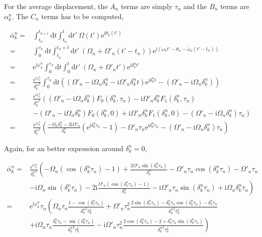 \documentclass[10pt,fleqn]{article}
\newcommand{\ud}{\mathrm{d}}
\newcommand{\ue}{\mathrm{e}}
\newcommand{\ui}{\mathrm{i}}
\newcommand{\eqar}[1]
{
  \begin{align*}
    #1
  \end{align*}
}
\newcommand{\paren}[1]{{\left({#1}\right)}}
\newcommand{\lparen}[1]{{\left({#1}\right.}}
\newcommand{\rparen}[1]{{\left.{#1}\right)}}
\begin{document}
For the average displacement, the $A_n$ terms are simply $\tau_n$ and the $B_n$ terms
are $\alpha_k^n$. The $C_n$ terms has to be computed,
\eqar{
  \bar\alpha_k^n=&\int_{t_{n}}^{t_{n+1}}\!\!\ud t\int_{t_n}^{t}\!\!\ud t'\ \Omega(t')\ue^{\ui\theta_k(t')}\\
  =&\int_{0}^{\tau_n}\!\!\ud t\int_{t_n}^{t_n+t}\!\!\ud t'\ \paren{\Omega_n+\Omega'_n\paren{t'-t_n}}\ue^{\ui\paren{\omega_kt'-\theta_n-\bar\omega_n\paren{t'-t_n}}}\\
  =&\ue^{\ui\varphi_k^n}\int_{0}^{\tau_n}\!\!\ud t\int_{0}^{t}\!\!\ud t'\ \paren{\Omega_n+\Omega'_n t'}\ue^{\ui\delta_k^nt'}\\
  =&\frac{\ue^{\ui\varphi_k^n}}{{\delta_k^n}^2}\int_{0}^{\tau_n}\!\!\ud t
  \paren{\paren{\Omega'_n-\ui\Omega_n\delta_k^n-\ui\Omega'_n\delta_k^nt}\ue^{\ui\delta_k^nt}-\paren{\Omega'_n-\ui\Omega_n\delta_k^n}}\\
  =&\frac{\ue^{\ui\varphi_k^n}}{{\delta_k^n}^2}
  \lparen{\paren{\Omega'_n-\ui\Omega_n\delta_k^n}F_0(\delta_k^n, \tau_n)-\ui\Omega'_n\delta_k^nF_1(\delta_k^n, \tau_n)}\\
  &\rparen{-\paren{\Omega'_n-\ui\Omega_n\delta_k^n}F_0(\delta_k^n, 0)+\ui\Omega'_n\delta_k^nF_1(\delta_k^n, 0)-\paren{\Omega'_n-\ui\Omega_n\delta_k^n}\tau_n}\\
  =&\frac{\ue^{\ui\varphi_k^n}}{{\delta_k^n}^2}
  \paren{\frac{-\Omega_n\delta_k^n-2\ui\Omega'_n}{{\delta_k^n}}\paren{\ue^{\ui{\delta_k^n}\tau_n} - 1}-\Omega'_n\tau_n\ue^{\ui{\delta_k^n}\tau_n}-\paren{\Omega'_n-\ui\Omega_n\delta_k^n}\tau_n}
}

Again, for an better expression around $\delta_k^n=0$,
\eqar{
  \bar\alpha_k^n=&\frac{\ue^{\ui\varphi_k^n}}{{\delta_k^n}^2}
  \lparen{
    -\Omega_n\paren{\cos\paren{{\delta_k^n}\tau_n}-1}
    +\frac{2\Omega'_n\sin\paren{{\delta_k^n}\tau_n}}{{\delta_k^n}}
    -\Omega'_n\tau_n\cos\paren{{\delta_k^n}\tau_n}
    -\Omega'_n\tau_n
  }\\
  &\rparen{
    -\ui\Omega_n\sin\paren{{\delta_k^n}\tau_n}
    -2\ui\frac{\Omega'_n\paren{\cos\paren{{\delta_k^n}\tau_n}-1}}{{\delta_k^n}}
    -\ui\Omega'_n\tau_n\sin\paren{{\delta_k^n}\tau_n}
    +\ui\Omega_n\delta_k^n\tau_n
  }\\
  =&\ue^{\ui\varphi_k^n}\tau_n
  \lparen{
    \Omega_n\tau_n\frac{1-\cos\paren{{\delta_k^n}\tau_n}}{{\delta_k^n}^2\tau_n^2}
    +\Omega'_n\tau_n^2\frac{2\sin\paren{{\delta_k^n}\tau_n}
      -{\delta_k^n}\tau_n\cos\paren{{\delta_k^n}\tau_n}
      -{\delta_k^n}\tau_n
    }{{\delta_k^n}^3\tau_n^3}
  }\\
  &\rparen{
    +\ui\Omega_n\tau_n\frac{\delta_k^n\tau_n-\sin\paren{{\delta_k^n}\tau_n}}{{\delta_k^n}^2\tau_n^2}
    -\ui\Omega'_n\tau_n^2\frac{2\cos\paren{{\delta_k^n}\tau_n}-2+\delta_k^n\tau_n\sin\paren{{\delta_k^n}\tau_n}}{{\delta_k^n}^3\tau_n^3}
  }
}
\end{document}
